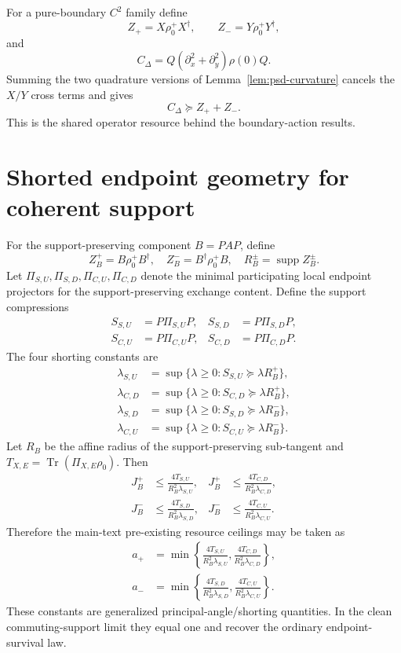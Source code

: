 \documentclass[aps,pra,preprint,nofootinbib]{revtex4-2}
\newcommand{\Tr}{\operatorname{Tr}}
\newcommand{\supp}{\operatorname{supp}}
\newcommand{\rhozero}{\rho_0}
\begin{document}
For a pure-boundary $C^2$ family define
\begin{equation}
Z_+=X\rhozero^+X^\dagger,
\qquad
Z_-=Y\rhozero^+Y^\dagger,
\end{equation}
and
\begin{equation}
C_\Delta=Q(\partial_x^2+\partial_y^2)\rho(0)Q.
\end{equation}
Summing the two quadrature versions of Lemma~\ref{lem:psd-curvature} cancels the $X/Y$ cross terms and gives
\begin{equation}
C_\Delta\succeq Z_++Z_-.
\label{eq:shared-curvature}
\end{equation}
This is the shared operator resource behind the boundary-action results.

\section{Shorted endpoint geometry for coherent support}
\label{supp:shorting}

For the support-preserving component $B=PAP$, define
\begin{equation}
Z_B^+=B\rhozero^+B^\dagger,
\quad
Z_B^-=B^\dagger\rhozero^+B,
\quad
R_B^\pm=\supp Z_B^\pm.
\end{equation}
Let $\Pi_{S,U},\Pi_{S,D},\Pi_{C,U},\Pi_{C,D}$ denote the minimal participating local endpoint projectors for the support-preserving exchange content. Define the support compressions
\begin{align}
S_{S,U}&=P\Pi_{S,U}P,&S_{S,D}&=P\Pi_{S,D}P,\\
S_{C,U}&=P\Pi_{C,U}P,&S_{C,D}&=P\Pi_{C,D}P.
\end{align}
The four shorting constants are
\begin{align}
\lambda_{S,U}&=\sup\{\lambda\ge0:S_{S,U}\succeq\lambda R_B^+\},\\
\lambda_{C,D}&=\sup\{\lambda\ge0:S_{C,D}\succeq\lambda R_B^+\},\\
\lambda_{S,D}&=\sup\{\lambda\ge0:S_{S,D}\succeq\lambda R_B^-\},\\
\lambda_{C,U}&=\sup\{\lambda\ge0:S_{C,U}\succeq\lambda R_B^-\}.
\end{align}
Let $R_B$ be the affine radius of the support-preserving sub-tangent and $T_{X,E}=\Tr(\Pi_{X,E}\rhozero)$. Then
\begin{align}
J_B^+&\le\frac{4T_{S,U}}{R_B^2\lambda_{S,U}},&
J_B^+&\le\frac{4T_{C,D}}{R_B^2\lambda_{C,D}},\\
J_B^-&\le\frac{4T_{S,D}}{R_B^2\lambda_{S,D}},&
J_B^-&\le\frac{4T_{C,U}}{R_B^2\lambda_{C,U}}.
\end{align}
Therefore the main-text pre-existing resource ceilings may be taken as
\begin{align}
a_+&=\min\!\left\{
\frac{4T_{S,U}}{R_B^2\lambda_{S,U}},
\frac{4T_{C,D}}{R_B^2\lambda_{C,D}}
\right\},\\
a_-&=\min\!\left\{
\frac{4T_{S,D}}{R_B^2\lambda_{S,D}},
\frac{4T_{C,U}}{R_B^2\lambda_{C,U}}
\right\}.
\label{eq:apm-short}
\end{align}
These constants are generalized principal-angle/shorting quantities. In the clean commuting-support limit they equal one and recover the ordinary endpoint-survival law.
\end{document}
